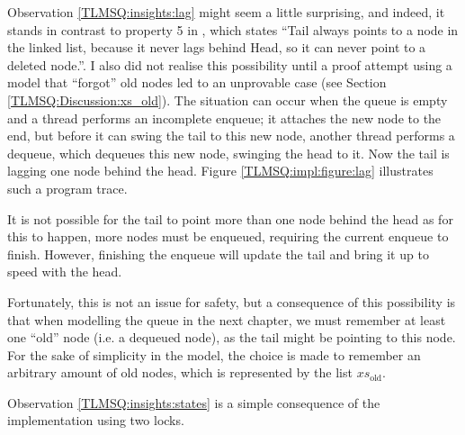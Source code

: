 \documentclass[a4paper, 10pt]{report}
\theoremstyle{definition}
\newcommand{\xsold}{xs_{\mathrm{old}}}
\begin{document}
Observation \ref{TLMSQ:insights:lag} might seem a little surprising, and indeed, it stands in contrast to property 5 in \citet{DBLP:conf/podc/MichaelS96}, which states \enquote{Tail always points to a node in the linked list, because it never lags behind Head, so it can never point to a deleted node.}. I also did not realise this possibility until a proof attempt using a model that ``forgot'' old nodes led to an unprovable case (see Section \ref{TLMSQ:Discussion:xs_old}). The situation can occur when the queue is empty and a thread performs an incomplete enqueue; it attaches the new node to the end, but before it can swing the tail to this new node, another thread performs a dequeue, which dequeues this new node, swinging the head to it. Now the tail is lagging one node behind the head. Figure \ref{TLMSQ:impl:figure:lag} illustrates such a program trace.

It is not possible for the tail to point more than one node behind the head as for this to happen, more nodes must be enqueued, requiring the current enqueue to finish. However, finishing the enqueue will update the tail and bring it up to speed with the head.

Fortunately, this is not an issue for safety, but a consequence of this possibility is that when modelling the queue in the next chapter, we must remember at least one ``old'' node (i.e. a dequeued node), as the tail might be pointing to this node. For the sake of simplicity in the model, the choice is made to remember an arbitrary amount of old nodes, which is represented by the list $\xsold$.

Observation \ref{TLMSQ:insights:states} is a simple consequence of the implementation using two locks.
\end{document}
